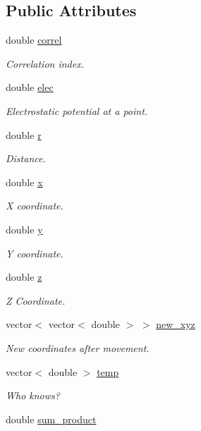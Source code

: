 \subsection*{Public Attributes}
\begin{DoxyCompactItemize}
\item 
double \hyperlink{classCORREL_a2b11224b8d555ae6fc1d66f7562fd275}{correl}
\begin{DoxyCompactList}\small\item\em Correlation index. \end{DoxyCompactList}\item 
double \hyperlink{classCORREL_a5b188c7301ac67c54d9ad7ea4f6f0e1a}{elec}
\begin{DoxyCompactList}\small\item\em Electrostatic potential at a point. \end{DoxyCompactList}\item 
double \hyperlink{classCORREL_a914a8b0995015e82256961cbb676717c}{r}
\begin{DoxyCompactList}\small\item\em Distance. \end{DoxyCompactList}\item 
double \hyperlink{classCORREL_a8bfe969d5de8f1138ab78b96c81efe68}{x}
\begin{DoxyCompactList}\small\item\em X coordinate. \end{DoxyCompactList}\item 
double \hyperlink{classCORREL_a7b95f3b9f6b49a0f30803573d28b08d2}{y}
\begin{DoxyCompactList}\small\item\em Y coordinate. \end{DoxyCompactList}\item 
double \hyperlink{classCORREL_a733e2083e37dc8cd372b71f7d04bd645}{z}
\begin{DoxyCompactList}\small\item\em Z Coordinate. \end{DoxyCompactList}\item 
vector$<$ vector$<$ double $>$ $>$ \hyperlink{classCORREL_a981a6452d3eec84cb9dd7d6c7dc7d47d}{new\_\-xyz}
\begin{DoxyCompactList}\small\item\em New coordinates after movement. \end{DoxyCompactList}\item 
vector$<$ double $>$ \hyperlink{classCORREL_a898800161dee6f1625130c54948a8f03}{temp}
\begin{DoxyCompactList}\small\item\em Who knows? \end{DoxyCompactList}\item 
double \hyperlink{classCORREL_a5befccd178218ad79376170652d91335}{sum\_\-product}
\end{DoxyCompactItemize}


